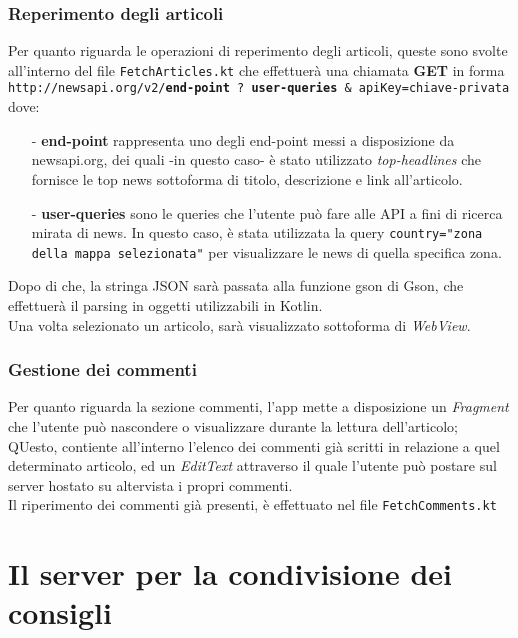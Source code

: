\documentclass[12pt]{article}
\def\code#1{\texttt{#1}}
\begin{document}
\subsubsection{Reperimento degli articoli}
Per quanto riguarda le operazioni di reperimento degli articoli, queste sono svolte all'interno del file \code{FetchArticles.kt} che effettuerà una chiamata \textbf{GET} in forma\\ \code{http://newsapi.org/v2/\textbf{end-point} ? \textbf{user-queries} \& apiKey=chiave-privata} dove:
\begin{itemize}
\item[-]\textbf{end-point} rappresenta uno degli end-point messi a disposizione da newsapi.org, dei quali -in questo caso- è stato utilizzato \textit{top-headlines} che fornisce le top news sottoforma di titolo, descrizione e link all'articolo.
\item[-]\textbf{user-queries} sono le queries che l'utente può fare alle API a fini di ricerca mirata di news. In questo caso, è stata utilizzata la query \code{country="zona della mappa selezionata"} per visualizzare le news di quella specifica zona.
\end{itemize}
Dopo di che, la stringa JSON sarà passata alla funzione gson di Gson, che effettuerà il parsing in oggetti utilizzabili in Kotlin.\\
Una volta selezionato un articolo, sarà visualizzato sottoforma di \textit{WebView}.
\subsubsection{Gestione dei commenti}
Per quanto riguarda la sezione commenti, l'app mette a disposizione un \textit{Fragment} che l'utente può nascondere o visualizzare durante la lettura dell'articolo;\\
QUesto, contiente all'interno l'elenco dei commenti già scritti in relazione a quel determinato articolo, ed un \textit{EditText} attraverso il quale l'utente può postare sul server hostato su altervista i propri commenti.\\
Il riperimento dei commenti già presenti, è effettuato nel file \code{FetchComments.kt}
	
\newpage
\section{Il server per la condivisione dei consigli}
\end{document}
